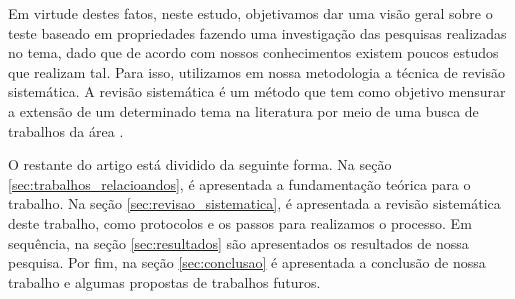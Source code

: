 	Em virtude destes fatos, neste estudo, objetivamos dar uma visão geral sobre o teste baseado em propriedades fazendo uma investigação das pesquisas realizadas no tema, dado que de acordo com nossos conhecimentos existem poucos estudos que realizam tal. Para isso, utilizamos em nossa metodologia a técnica de revisão sistemática. A revisão sistemática é um método que tem como objetivo mensurar a extensão de um determinado tema na literatura por meio de uma busca de trabalhos da área \cite{petersen2008systematic}.

	O restante do artigo está dividido da seguinte forma. Na seção \ref{sec:trabalhos_relacioandos}, é apresentada a fundamentação teórica para o trabalho. Na seção \ref{sec:revisao_sistematica}, é apresentada a revisão sistemática deste trabalho, como protocolos e os passos para realizamos o processo. Em sequência, na seção \ref{sec:resultados} são apresentados os resultados de nossa pesquisa. Por fim, na seção \ref{sec:conclusao} é apresentada a conclusão de nossa trabalho e algumas propostas de trabalhos futuros.
